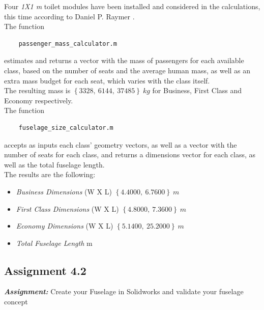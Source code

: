 \documentclass{article}
\begin{document}
Four \textit{1X1 m} toilet modules have been installed and considered in the calculations, this time according to Daniel P. Raymer \autocite{Raymer_Daniel}.\\ 

The function \autocite{Airbus_replacement_repo}
\begin{verbatim}
    passenger_mass_calculator.m
\end{verbatim}

estimates and returns a vector with the mass of passengers for each available class, based on the number of seats and
the average human mass, as well as an extra mass budget for each seat, which varies with the class itself.\\ 

The resulting mass is $\left \{ 3328,  \  6144, \  37485 \right \} \ kg$ for Business, First Class and Economy respectively. \\ 

The function 
\begin{verbatim}
    fuselage_size_calculator.m
\end{verbatim}

accepts as inputs each class' geometry vectors, as well as a vector with the number of seats for each class, 
and returns a dimensions vector for each class, as well as the total fuselage length. \\ 

The results are the following:
\begin{itemize}
    \item \textit{Business Dimensions} (W X L)
        \subitem  $\left \{4.4000, \ 6.7600 \right \} \ m$
    \item \textit{First Class Dimensions} (W X L)
        \subitem  $\left \{4.8000, \ 7.3600 \right \} \ m$
    \item \textit{Economy Dimensions} (W X L)
        \subitem  $\left \{5.1400, \ 25.2000 \right \} \ m$
    \item \textit{Total Fuselage Length}
         m
\end{itemize}

\clearpage


\subsection{Assignment 4.2\label{Assignment_4.2}}

\textbf{\textit{Assignment:}} Create your Fuselage in Solidworks 
and validate your fuselage concept
\end{document}
